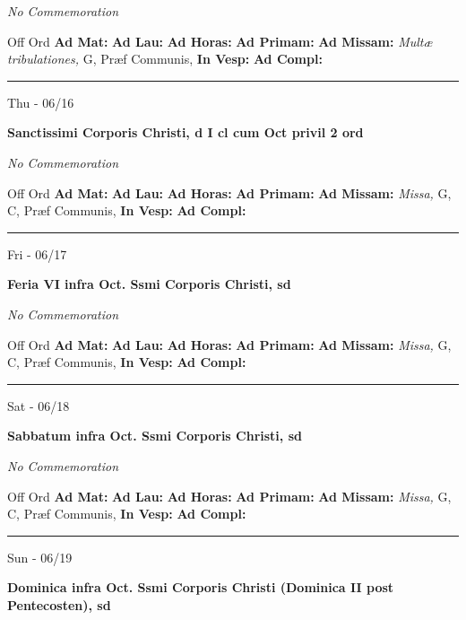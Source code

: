 \documentclass[letterpaper, 10pt]{article}
\begin{document}
\textit{No Commemoration}\begin{justify}
Off Ord
\textbf{Ad Mat: }
\textbf{Ad Lau: }
\textbf{Ad Horas: }
\textbf{Ad Primam: }
\textbf{Ad Missam:} \textit{Multæ tribulationes, } G, Præf Communis, 
\textbf{In Vesp: }
\textbf{Ad Compl: }\end{justify}



\hrule
\begin{center}
Thu - 06/16
\end{center}\textbf{ \large Sanctissimi Corporis Christi, \textnormal{\normalsize d I cl cum Oct privil 2 ord}}

\textit{No Commemoration}\begin{justify}
Off Ord
\textbf{Ad Mat: }
\textbf{Ad Lau: }
\textbf{Ad Horas: }
\textbf{Ad Primam: }
\textbf{Ad Missam:} \textit{Missa, } G, C, Præf Communis, 
\textbf{In Vesp: }
\textbf{Ad Compl: }\end{justify}



\hrule
\begin{center}
Fri - 06/17
\end{center}\textbf{ \large Feria VI infra Oct. Ssmi Corporis Christi, \textnormal{\normalsize sd}}

\textit{No Commemoration}\begin{justify}
Off Ord
\textbf{Ad Mat: }
\textbf{Ad Lau: }
\textbf{Ad Horas: }
\textbf{Ad Primam: }
\textbf{Ad Missam:} \textit{Missa, } G, C, Præf Communis, 
\textbf{In Vesp: }
\textbf{Ad Compl: }\end{justify}



\hrule
\begin{center}
Sat - 06/18
\end{center}\textbf{ \large Sabbatum infra Oct. Ssmi Corporis Christi, \textnormal{\normalsize sd}}

\textit{No Commemoration}\begin{justify}
Off Ord
\textbf{Ad Mat: }
\textbf{Ad Lau: }
\textbf{Ad Horas: }
\textbf{Ad Primam: }
\textbf{Ad Missam:} \textit{Missa, } G, C, Præf Communis, 
\textbf{In Vesp: }
\textbf{Ad Compl: }\end{justify}



\hrule
\begin{center}
Sun - 06/19
\end{center}\textbf{ \large Dominica infra Oct. Ssmi Corporis Christi (Dominica II post Pentecosten), \textnormal{\normalsize sd}}
\end{document}
